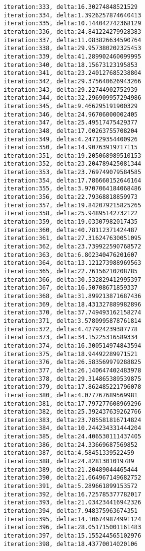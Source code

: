 \documentclass[11pt]{article}
\begin{document}
\begin{Verbatim}[commandchars=\\\{\}]
iteration:333, delta:16.30274848521529
iteration:334, delta:1.3926257874640413
iteration:335, delta:10.144042742368129
iteration:336, delta:24.841224279928383
iteration:337, delta:11.083826634590764
iteration:338, delta:29.957380202325453
iteration:339, delta:41.289902460099995
iteration:340, delta:18.15673123195853
iteration:341, delta:23.240127685238804
iteration:342, delta:29.375640626943266
iteration:343, delta:29.22744902752939
iteration:344, delta:32.296909957294986
iteration:345, delta:9.466295191900329
iteration:346, delta:24.96706000002405
iteration:347, delta:25.49517475429377
iteration:348, delta:17.00263755708204
iteration:349, delta:4.247129354400926
iteration:350, delta:14.90763919717115
iteration:351, delta:19.205068989510153
iteration:352, delta:23.204789425081344
iteration:353, delta:23.769749079584585
iteration:354, delta:17.786660152646164
iteration:355, delta:3.9707064184068486
iteration:356, delta:22.79368818859973
iteration:357, delta:19.842079215825265
iteration:358, delta:25.94895142732122
iteration:359, delta:19.03307982017435
iteration:360, delta:40.78112371424487
iteration:361, delta:27.316247630051095
iteration:362, delta:23.739922590768572
iteration:363, delta:6.802340476201607
iteration:364, delta:13.121273988969563
iteration:365, delta:22.76156210208785
iteration:366, delta:30.532829412995397
iteration:367, delta:16.50708671859337
iteration:368, delta:31.899213871687436
iteration:369, delta:18.431327889982896
iteration:370, delta:37.749493162158274
iteration:371, delta:3.5780995878761814
iteration:372, delta:4.427924239387778
iteration:373, delta:34.15225316589334
iteration:374, delta:16.300514974843594
iteration:375, delta:18.94492289971521
iteration:376, delta:26.583569979288825
iteration:377, delta:26.140647402483978
iteration:378, delta:29.314865389539875
iteration:379, delta:17.862485221796078
iteration:380, delta:4.077767689569981
iteration:381, delta:17.797277608969296
iteration:382, delta:25.392437639262766
iteration:383, delta:23.785581816714824
iteration:384, delta:10.244234331444204
iteration:385, delta:24.406530111437405
iteration:386, delta:24.33669687569852
iteration:387, delta:4.58451339522459
iteration:388, delta:24.8281301019789
iteration:389, delta:21.20489044465444
iteration:390, delta:21.664967149682752
iteration:391, delta:5.289661899153572
iteration:392, delta:16.725785377782017
iteration:393, delta:21.034234416942326
iteration:394, delta:7.948375963674351
iteration:395, delta:14.106749874991124
iteration:396, delta:28.051715001161483
iteration:397, delta:15.155244565102976
iteration:398, delta:18.43770014020106

\end{Verbatim}
\end{document}
